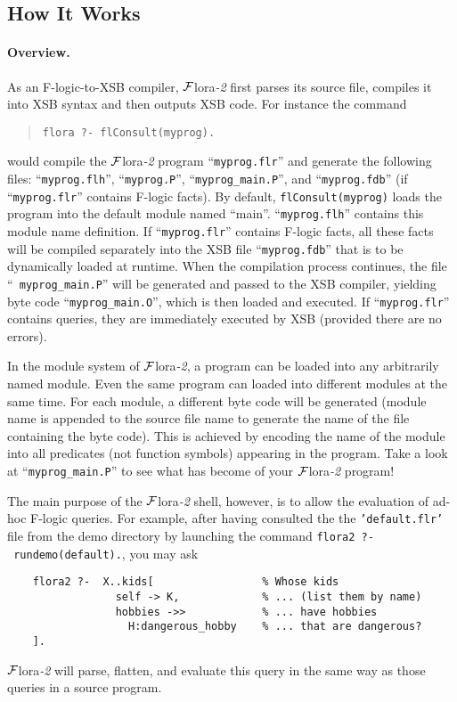 \documentclass[11pt]{article}
\newcommand{\FLORA}{{\mbox{${\cal F}${\sc lora}\rm\emph{-2}}}\xspace}
\newcommand{\fl}{\mbox{F-logic}\xspace}
\begin{document}
\subsection{How It Works}


\paragraph{Overview.}

As an \fl-to-XSB compiler, \FLORA first parses its source file,
compiles it into XSB syntax and then outputs XSB code. For instance the command
\begin{quote}
\verb|flora ?- flConsult(myprog).|
\end{quote}
would compile the \FLORA program ``{\tt myprog.flr}'' and generate the
following files: ``{\tt myprog.flh}'', ``{\tt myprog.P}'',
``{\tt myprog\_main.P}'', and ``{\tt myprog.fdb}'' (if ``{\tt myprog.flr}''
contains \fl facts).  By default, {\tt flConsult(myprog)} loads the
program into the default module named ``main''. ``{\tt myprog.flh}''
contains this module name definition.  If ``{\tt myprog.flr}''
contains \fl facts, all these facts will be compiled separately into
the XSB file ``{\tt myprog.fdb}'' that is to be dynamically loaded at
runtime. When the compilation process continues, the file ``{\tt
myprog\_main.P}'' will be generated and passed to the XSB compiler,
yielding byte code ``{\tt myprog\_main.O}'', which is then loaded and
executed.  If ``{\tt myprog.flr}'' contains queries, they are
immediately executed by XSB (provided there are no errors).

In the module system of \FLORA, a program can be loaded into any
arbitrarily named module. Even the same program can loaded into
different modules at the same time. For each module, a different byte
code will be generated (module name is appended to the source file
name to generate the name of the file containing the byte code). This
is achieved by encoding the name of the module into all predicates
(not function symbols) appearing in the program. Take a look at
``{\tt myprog\_main.P}'' to see what has become of your \FLORA program!

The main purpose of the \FLORA shell, however, is to allow the evaluation
of ad-hoc \fl queries. For example, after having consulted the
the \texttt{'default.flr'} file from the demo directory by launching
the command \texttt{flora2~?-~rundemo(default).}, you may ask
\begin{verbatim}
    flora2 ?-  X..kids[                 % Whose kids
                 self -> K,             % ... (list them by name)
                 hobbies ->>            % ... have hobbies
                   H:dangerous_hobby    % ... that are dangerous?
    ]. 
\end{verbatim}
\FLORA will parse, flatten, and evaluate this query in the same way as
those queries in a source program.
\end{document}
